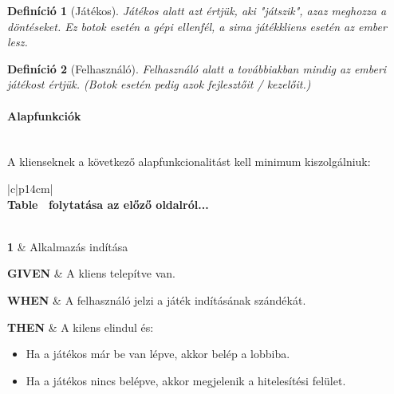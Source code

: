 \documentclass[twoside, a4paper, 12pt]{article}
\newtheorem{definition}{Definíció}
\begin{document}
\begin{definition}[Játékos]
	Játékos alatt azt értjük, aki "játszik", azaz meghozza a döntéseket. Ez botok esetén a gépi ellenfél, a sima játékkliens esetén az ember lesz.
\end{definition}

\begin{definition}[Felhasználó]
	Felhasználó alatt a továbbiakban mindig az emberi \textit{játékost} értjük. (Botok esetén pedig azok fejlesztőit / kezelőit.)
\end{definition}

\paragraph{Alapfunkciók} \mbox{} \\
A klienseknek a következő alapfunkcionalitást kell minimum kiszolgálniuk:

\begin{longtable}[c]{|c|p{14cm}|}
	\hline
	\rowcolor[HTML]{6665CD}
	 \\ \hline
	\endfirsthead
	\multicolumn{2}{c}%
	{{\bfseries Table \thetable\ folytatása az előző oldalról...}} \\
	\hline
	 \\ \hline
	\endhead
	\rowcolor[HTML]{CBCEFB} 
	
	\textbf{1}
	&	Alkalmazás indítása
	\\ \nobreakhline
	
	\textbf{GIVEN} &
	A kliens telepítve van.
	\\ \nobreakhline
	
	\textbf{WHEN} &
	A felhasználó jelzi a játék indításának szándékát.
	\\
	\nobreakhline
	
	\textbf{THEN} &
	A kilens elindul és:
	\begin{itemize}
		\item Ha a játékos már be van lépve, akkor belép a lobbiba.
		\item Ha a játékos nincs belépve, akkor megjelenik a hitelesítési felület.
	\end{itemize} 
	\\
	\hline
	
	\caption{Kliens alapfunkciói - indítás}
	\label{userStories:client:start}\\
\end{longtable} 
\end{document}
